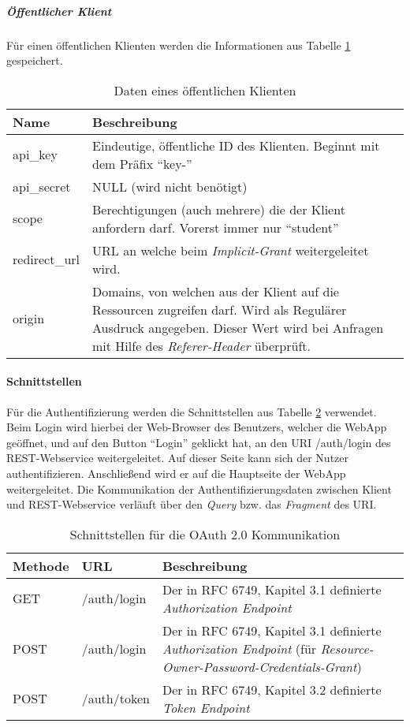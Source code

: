 \subparagraph{Öffentlicher Klient}
Für einen öffentlichen Klienten werden die Informationen aus Tabelle  \ref{tab:api-auth-public-client-data} gespeichert. \\
\begin{table}
	\begin{tabularx}{\textwidth}{@{} | X | X | @{}}
		\hline
		\textbf{Name} & \textbf{Beschreibung}\\ \hline \hline
		api\_key & Eindeutige, öffentliche ID des Klienten. Beginnt mit dem Präfix \enquote{key-} \\ \hline
		api\_secret & NULL (wird nicht benötigt) \\ \hline
		scope & Berechtigungen (auch mehrere) die der Klient anfordern darf. Vorerst immer nur \enquote{student} \\ \hline
		redirect\_url & URL an welche beim \textit{Implicit-Grant} weitergeleitet wird. \\ \hline
		origin & Domains, von welchen aus der Klient auf die Ressourcen zugreifen darf. Wird als Regulärer Ausdruck angegeben. Dieser Wert wird bei Anfragen mit Hilfe des \textit{Referer-Header} überprüft. \\
		\hline
	\end{tabularx}
\caption{Daten eines öffentlichen Klienten}
\label{tab:api-auth-public-client-data}
\end{table}
\paragraph{Schnittstellen}
Für die Authentifizierung werden die Schnittstellen aus Tabelle \ref{tab:api-auth-endpoints} verwendet.
Beim Login wird hierbei der Web-Browser des Benutzers, welcher die WebApp geöffnet, und auf den Button \enquote{Login} geklickt hat, an den URI /auth/login des REST-Webservice weitergeleitet. Auf dieser Seite kann sich der Nutzer authentifizieren. Anschließend wird er auf die Hauptseite der WebApp weitergeleitet. Die Kommunikation der Authentifizierungsdaten zwischen Klient und REST-Webservice verläuft über den \textit{Query} \cite[Kap 3.4]{rfc3986} bzw. das \textit{Fragment} \cite[Kap. 3.5]{rfc3986} des URI.

\begin{table}
	\begin{tabularx}{\textwidth}{@{} | X | X | X | @{}}
		\hline
		\textbf{Methode} & \textbf{URL} & \textbf{Beschreibung} \\ \hline \hline
		GET & /auth/login & Der in RFC 6749, Kapitel 3.1 definierte \textit{Authorization Endpoint} \\ \hline
		POST & /auth/login & Der in RFC 6749, Kapitel 3.1 definierte \textit{Authorization Endpoint} (für \textit{Resource-Owner-Password-Credentials-Grant}) \\ \hline
		POST & /auth/token & Der in RFC 6749, Kapitel 3.2 definierte \textit{Token Endpoint} \\ \hline
	\end{tabularx}
\caption{Schnittstellen für die OAuth 2.0 Kommunikation}
\label{tab:api-auth-endpoints}
\end{table}

